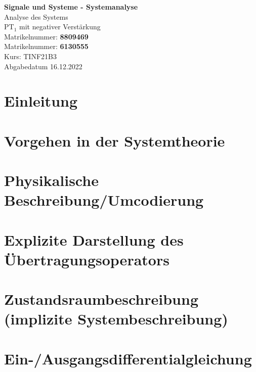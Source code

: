 \documentclass[
  ngerman
  ,12pt
  ,pdftex
]{article}
\begin{document}
\begin{titlepage}
  \begin{center}
      {\Huge \textbf{Signale und Systeme - Systemanalyse}}\\[1.5cm]
      {\Large Analyse des Systems}\\[1cm]
      {\Huge PT$_{1}$ mit negativer Verstärkung}\\[7cm]
      {\large Matrikelnummer: \textbf{8809469}}\\[0.5cm]
      {\large Matrikelnummer: \textbf{6130555}}\\[0.5cm]
      {\large Kurs: TINF21B3}\\[0.5cm]
      {\large Abgabedatum 16.12.2022}
      \vfill
  \end{center}
\end{titlepage}
\newpage
\tableofcontents
\newpage


\section{Einleitung}  %


\section*{Vorgehen in der Systemtheorie}   %


\section{Physikalische Beschreibung/Umcodierung}   %


\section{Explizite Darstellung des Übertragungsoperators}    %


\section{Zustandsraumbeschreibung (implizite Systembeschreibung)}   %


\section{Ein-/Ausgangsdifferentialgleichung}   %

\end{document}
